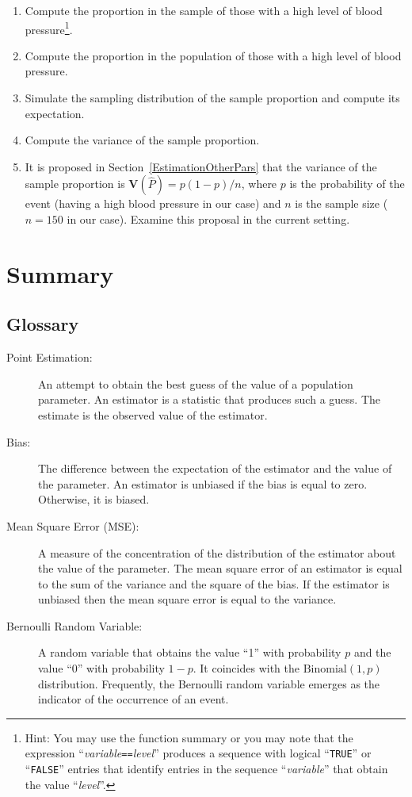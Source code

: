 \documentclass[]{krantz}
\newcommand{\Var}{\mathbf{V}}
\theoremstyle{definition}
\theoremstyle{definition}
\theoremstyle{definition}
\theoremstyle{remark}
\begin{document}
\begin{enumerate}
\def\labelenumi{\arabic{enumi}.}
\item
  Compute the proportion in the sample of those with a high level of
  blood pressure\footnote{Hint: You may use the function summary or you may note that the
    expression ``\emph{variable}\texttt{==}\emph{level}'' produces a sequence with logical
    ``\texttt{TRUE}'' or ``\texttt{FALSE}'' entries that identify entries in the sequence
    ``\emph{variable}'' that obtain the value ``\emph{level}''.}.
\item
  Compute the proportion in the population of those with a high level
  of blood pressure.
\item
  Simulate the sampling distribution of the sample proportion and
  compute its expectation.
\item
  Compute the variance of the sample proportion.
\item
  It is proposed in Section~\ref{EstimationOtherPars} that the variance
  of the sample proportion is \(\Var(\hat P) = p(1-p)/n\), where \(p\) is
  the probability of the event (having a high blood pressure in our
  case) and \(n\) is the sample size (\(n=150\) in our case). Examine this
  proposal in the current setting.
\end{enumerate}

\hypertarget{summary-8}{%
\section{Summary}\label{summary-8}}

\hypertarget{glossary}{%
\subsection*{Glossary}\label{glossary}}


\begin{description}
\item[Point Estimation:]
An attempt to obtain the best guess of the value of a population
parameter. An estimator is a statistic that produces such a guess.
The estimate is the observed value of the estimator.
\item[Bias:]
The difference between the expectation of the estimator and the
value of the parameter. An estimator is unbiased if the bias is
equal to zero. Otherwise, it is biased.
\item[Mean Square Error (MSE):]
A measure of the concentration of the distribution of the estimator
about the value of the parameter. The mean square error of an
estimator is equal to the sum of the variance and the square of the
bias. If the estimator is unbiased then the mean square error is
equal to the variance.
\item[Bernoulli Random Variable:]
A random variable that obtains the value ``1'' with probability \(p\)
and the value ``0'' with probability \(1-p\). It coincides with the
\(\mathrm{Binomial}(1,p)\) distribution. Frequently, the Bernoulli
random variable emerges as the indicator of the occurrence of an
event.
\end{description}
\end{document}
